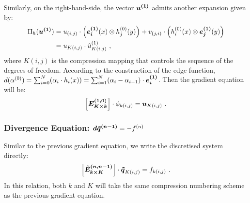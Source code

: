 Similarly, on the right-hand-side, the vector $\boldsymbol{u^{(1)}}$ admits another expansion given by:
\begin{align}
	\Pi_h(\boldsymbol{u^{(1)}}) &= u_{(i,j)} \cdot \left(\boldsymbol{e_i^{(1)}}(x) \otimes h_j^{(0)}(y) \right) + v_{(j,i)} \cdot \left(h_i^{(0)}(x) \otimes \boldsymbol{e_j^{(1)}}(y) \right) \\
	 &= u_{K(i,j)} \cdot \hat{u}_{K(i,j)}^{(1)}\ ,
\end{align}
where $K(i,j)$ is the compression mapping that controls the sequence of the degrees of freedom. According to the construction of the edge function, $d(\alpha^{(0)})=\sum_{i=0}^{N}(\alpha_i \cdot h_i(x) ) = \sum_{i=1}^{N}(\alpha_i - \alpha_{i-1})\cdot\boldsymbol{e_i^{(1)}} $. Then the gradient equation will be:
\begin{equation}
	\left[\vect{E_{K\times k}^{(1,0)}}\right] \cdot \phi _{k(i,j)} = \vect{u}_{K(i,j)}\ .
\end{equation} 

\subsubsection{Divergence Equation: $\boldsymbol{d\tilde{q}^{(n-1)}} = -f^{(n)}$}
Similar to the previous gradient equation, we write the discretised system directly:
\begin{equation}
	\left[\vect{\tilde{E}_{k\times K}^{(n,n-1)}}\right] \cdot \vect{\tilde{q}}_{K(i,j)} = {f}_{k(i,j)}\ .
\end{equation}
In this relation, both $k$ and $K$ will take the same compression numbering scheme as the previous gradient equation. \\

